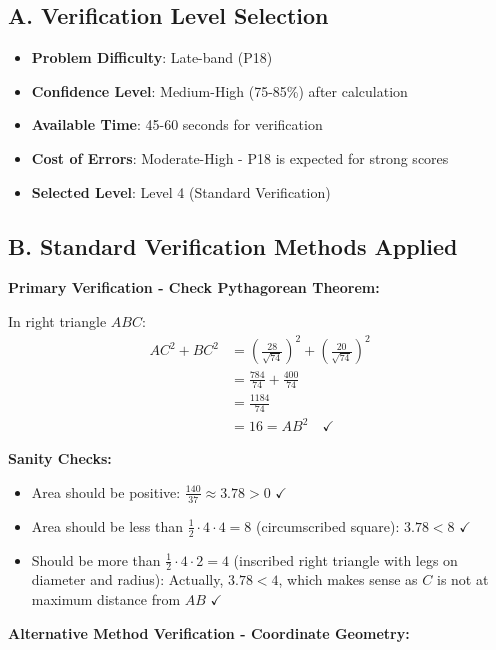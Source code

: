 \documentclass[]{article}
\begin{document}
\begin{verificationbox}
\subsection*{A. Verification Level Selection}
\begin{itemize}[leftmargin=*]
    \item \textbf{Problem Difficulty}: Late-band (P18)
    \item \textbf{Confidence Level}: Medium-High (75-85\%) after calculation
    \item \textbf{Available Time}: 45-60 seconds for verification
    \item \textbf{Cost of Errors}: Moderate-High - P18 is expected for strong scores
    \item \textbf{Selected Level}: Level 4 (Standard Verification)
\end{itemize}

\subsection*{B. Standard Verification Methods Applied}

\textbf{Primary Verification - Check Pythagorean Theorem:}

In right triangle $ABC$:
\begin{align*}
AC^2 + BC^2 &= \left(\frac{28}{\sqrt{74}}\right)^2 + \left(\frac{20}{\sqrt{74}}\right)^2\\
&= \frac{784}{74} + \frac{400}{74}\\
&= \frac{1184}{74}\\
&= 16 = AB^2 \quad \checkmark
\end{align*}

\textbf{Sanity Checks:}
\begin{itemize}[leftmargin=*]
    \item Area should be positive: $\frac{140}{37} \approx 3.78 > 0$ $\checkmark$
    \item Area should be less than $\frac{1}{2} \cdot 4 \cdot 4 = 8$ (circumscribed square): $3.78 < 8$ $\checkmark$
    \item Should be more than $\frac{1}{2} \cdot 4 \cdot 2 = 4$ (inscribed right triangle with legs on diameter and radius): Actually, $3.78 < 4$, which makes sense as $C$ is not at maximum distance from $AB$ $\checkmark$
\end{itemize}

\textbf{Alternative Method Verification - Coordinate Geometry:}


\end{verificationbox}
\end{document}
